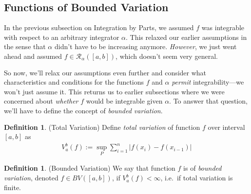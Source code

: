 \documentclass[12pt]{book}
\numberwithin{equation}{section} %
\theoremstyle{plain}
\theoremstyle{definition}
\newtheorem{defn}[thm]{Definition}
\theoremstyle{remark}
\begin{document}
\newpage
\subsection{Functions of Bounded Variation}

In the previous subsection on Integration by Parts, we assumed $f$ was
integrable with respect to an arbitrary integrator $\alpha$.  This
relaxed our earlier assumptions in the sense that $\alpha$ didn't have
to be increasing anymore.  \emph{However}, we just went ahead and
assumed $f\in\mathscr{R}_\alpha([a,b])$, which doesn't seem very
general.

So now, we'll relax our assumptions even further and consider what
characteristics and conditions for the functions $f$ and $\alpha$
\emph{permit} integrability---we won't just assume it.
This returns us to earlier subsections where we were concerned about
\emph{whether} $f$ would be integrable given $\alpha$. To answer that
question, we'll have to define the concept of \emph{bounded variation}.

\begin{defn}(Total Variation)
Define \emph{total variation} of function $f$ over interval $[a,b]$ as
\begin{align*}
    V_a^b(f) := \sup_P \sum^n_{i=1} \left\lvert f(x_i) - f(x_{i-1})
    \right\rvert
\end{align*}
\end{defn}


\begin{defn}(Bounded Variation)
We say that function $f$ is of \emph{bounded variation}, denoted
$f \in BV([a,b])$, if $V^b_a(f)<\infty$, i.e.\ if total variation is
finite.
\end{defn}
\end{document}

